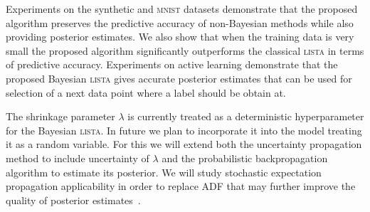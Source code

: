 \documentclass[letterpaper]{article}
\begin{document}
Experiments on the synthetic and \textsc{mnist} datasets demonstrate that the proposed algorithm preserves the predictive accuracy of non-Bayesian methods while also providing posterior estimates. We also show that when the training data is very small the proposed algorithm significantly outperforms the classical \textsc{lista} in terms of predictive accuracy. Experiments on active learning demonstrate that the proposed Bayesian \textsc{lista} gives accurate posterior estimates that can be used for selection of a next data point where a label should be obtain at.

The shrinkage parameter $\lambda$ is currently treated as a deterministic hyperparameter for the Bayesian \textsc{lista}. In future we plan to incorporate it into the model treating it as a random variable. For this we will extend both the uncertainty propagation method to include uncertainty of $\lambda$ and the probabilistic backpropagation algorithm to estimate its posterior. We will study stochastic expectation propagation applicability in order to replace ADF that may further improve the quality of posterior estimates~\citep{li2015stochastic}.



\end{document}
